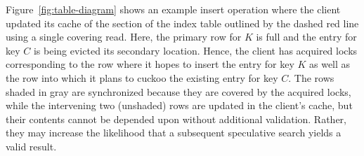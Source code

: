 Figure~\ref{fig:table-diagram} shows an example insert
operation where the client updated its cache of the section
of the index table outlined by the dashed red line using a
single covering read.  Here, the primary row for $K$ is full
and the entry for key $C$ is being evicted its secondary
location.  Hence, the client has acquired locks
corresponding to the row where it hopes to insert the entry
for key $K$ as well as the row into which it plans to cuckoo
the existing entry for key $C$.  The rows shaded in gray are
synchronized because they are covered by the acquired locks,
while the intervening two (unshaded) rows are updated in the
client's cache, but their contents cannot be depended upon
without additional validation.  Rather, they may increase
the likelihood that a subsequent speculative search yields a
valid result.

